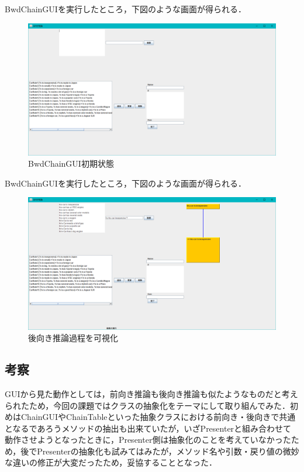 \documentclass[12pt]{jarticle}
\begin{document}
BwdChainGUIを実行したところ，下図のような画面が得られる．

\begin{figure}[!hbt]
  	\begin{center}
  		\includegraphics[scale=0.35]{images/gui3.png}
	\end{center}
  	\caption{BwdChainGUI初期状態}
\end{figure}
\clearpage

BwdChainGUIを実行したところ，下図のような画面が得られる．

\begin{figure}[!hbt]
  	\begin{center}
  		\includegraphics[scale=0.35]{images/gui4.png}
	\end{center}
  	\caption{後向き推論過程を可視化}
\end{figure}
\clearpage


\subsection{考察}
GUIから見た動作としては，前向き推論も後向き推論も似たようなものだと考えられたため，今回の課題ではクラスの抽象化をテーマにして取り組んでみた．初めはChainGUIやChainTableといった抽象クラスにおける前向き・後向きで共通となるであろうメソッドの抽出も出来ていたが，いざPresenterと組み合わせて動作させようとなったときに，Presenter側は抽象化のことを考えていなかったため，後でPresenterの抽象化も試みてはみたが，メソッド名や引数・戻り値の微妙な違いの修正が大変だったため，妥協することとなった．
\end{document}
